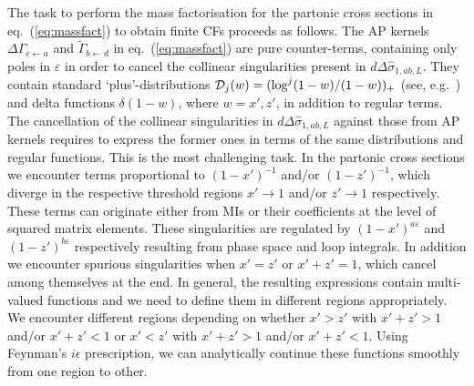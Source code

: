 \documentclass[%
 twocolumn,
 superscriptaddress,
 preprintnumbers,
 nofootinbib,
 amsmath,amssymb,
 aps,
 prl,
]{revtex4}
\begin{document}
{The task to perform the mass factorisation 
for the partonic cross sections in eq.~(\ref{eq:massfact}) 
to obtain finite CFs proceeds as follows. 
The AP kernels $\Delta \Gamma_{c\leftarrow a}$ and 
$\tilde \Gamma_{b\leftarrow d}$ in eq.~(\ref{eq:massfact}) are pure counter-terms, containing only poles in $\varepsilon$ in order to cancel the collinear singularities present in $d \Delta \hat{\sigma}_{1,ab,L}$. 
They contain standard `plus'-distributions ${\cal D}_j(w)=(\log^j(1-w)/(1-w))_+$ (see, e.g.~\cite{Goyal:2023xfi}) and delta functions $\delta(1-w)$,   
where $w=x',z'$, in addition to regular terms. 
The cancellation of the collinear singularities in $d \Delta \hat{\sigma}_{1,ab,L}$ against those from AP kernels requires to express the former ones in terms of the same distributions and regular functions. 
This is the most challenging task. 
In the partonic cross sections we encounter terms proportional to $(1-x')^{-1}$ and/or $(1-z')^{-1}$, 
which diverge in the respective threshold regions $x'\rightarrow 1$ and/or $z' \rightarrow 1$ respectively. 
These terms can originate either from MIs or their coefficients at the level of squared matrix elements.  
These singularities are regulated by $(1-x')^{a \varepsilon}$ and $(1-z')^{b\varepsilon}$ respectively
resulting from phase space and loop integrals.  
In addition we encounter spurious singularities when $x'=z'$ or $x'+z'=1$, which cancel among themselves at the end.  
In general, the resulting expressions contain multi-valued functions and we need to define them in different regions appropriately.  
We encounter different regions depending on whether $x'>z'$ with $x'+z'>1$ and/or $x'+z'<1$ or $x'<z'$ with $x'+z'>1$ and/or $x'+z'<1$.  
Using Feynman's $i \epsilon$ prescription, we can analytically continue these functions smoothly from one region to other.

}
\end{document}
